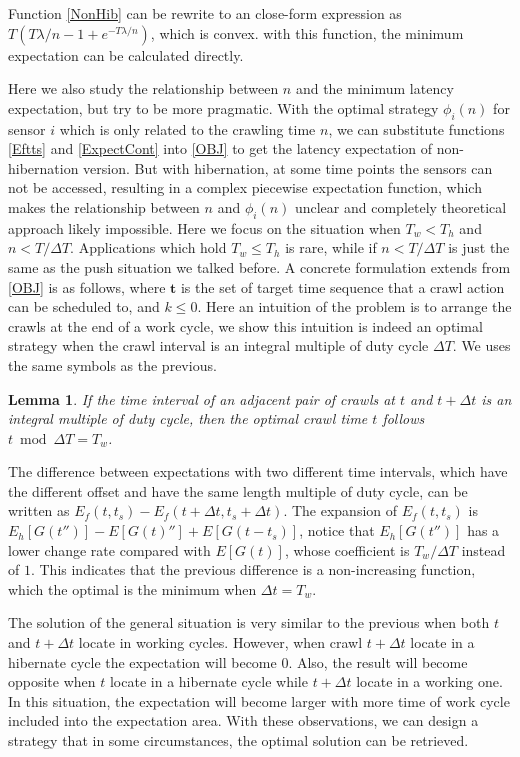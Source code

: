 \documentclass[conference]{IEEEtran}
\newtheorem{lemma}{Lemma}
\begin{document}
Function \eqref{NonHib} can be rewrite to an close-form expression as $T(T\lambda/n-1+e^{-T\lambda/n})$, which is convex. with this function, the minimum expectation can be calculated directly.

Here we also study the relationship between $n$ and the minimum latency expectation, but try to be more pragmatic.
With the optimal strategy $\phi_i(n)$ for sensor $i$ which is only related to the crawling time $n$, we can substitute functions \eqref{Eftts} and \eqref{ExpectCont} into \eqref{OBJ} to get the latency expectation of non-hibernation version. 
But with hibernation, at some time points the sensors can not be accessed, resulting in a complex piecewise expectation function, which makes the relationship between $n$ and $\phi_i(n)$ unclear and completely theoretical approach likely impossible.
Here we focus on the situation when $T_w<T_h$ and $n<T/\Delta T$. Applications which hold $T_w\leq T_h$ is rare, while if $n<T/\Delta T$ is just the same as the push situation we talked before.
A concrete formulation extends from \ref{OBJ} is as follows, where $\mathbf{t}$ is the set of target time sequence that a crawl action can be scheduled to, and $k\leq 0$.
Here an intuition of the problem is to arrange the crawls at the end of a work cycle, we show this intuition is indeed an optimal strategy when the crawl interval is an integral multiple of duty cycle $\Delta T$. We uses the same symbols as the previous.

\begin{lemma}
\label{intopt}
If the time interval of an adjacent pair of crawls at $t$ and $t+\Delta t$ is an integral multiple of duty cycle, then the optimal crawl time $t$ follows $t\bmod \Delta T=T_w$.
\end{lemma}

\begin{IEEEproof}
The difference between expectations with two different time intervals, which have the different offset and have the same length multiple of duty cycle, can be written as $E_f(t, t_s)-E_f(t+\Delta t, t_s+\Delta t)$. 
The expansion of $E_f(t,t_s)$ is $E_h[G(t'')]-E[G(t)'']+E[G(t-t_s)]$, notice that $E_h[G(t'')]$ has a lower change rate compared with $E[G(t)]$, whose coefficient is $T_w/\Delta T$ instead of $1$. This indicates that the previous difference is a non-increasing function, which the optimal is the minimum when $\Delta t =T_w$.
\end{IEEEproof}


The solution of the general situation is very similar to the previous when both $t$ and $t+\Delta t$ locate in working cycles. However, when crawl $t+\Delta t$  locate in a hibernate cycle the expectation will become $0$. Also, the result will become opposite when $t$ locate in a hibernate cycle while $t+\Delta t$ locate in a working one. In this situation, the expectation will become larger with more time of work cycle included into the expectation area. 
With these observations, we can design a strategy that in some circumstances, the optimal solution can be retrieved.
\end{document}
